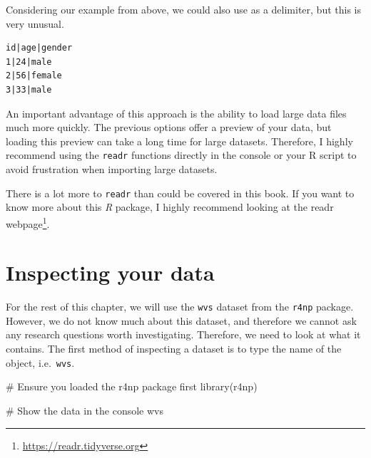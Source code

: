 \documentclass[
  letterpaper,
]{krantz}
\makeatletter
\newenvironment{Shaded}{\begin{snugshade}}{\end{snugshade}}
\newcommand{\CommentTok}[1]{\textcolor[rgb]{0.37,0.37,0.37}{#1}}
\newcommand{\FunctionTok}[1]{\textcolor[rgb]{0.28,0.35,0.67}{#1}}
\newcommand{\NormalTok}[1]{\textcolor[rgb]{0.00,0.23,0.31}{#1}}
\renewcommand{\href}[2]{#2\footnote{\url{#1}}}
\newenvironment{kframe}{%
\medskip{}
\setlength{\fboxsep}{.8em}
 \def\at@end@of@kframe{}%
 \ifinner\ifhmode%
  \def\at@end@of@kframe{\end{minipage}}%
  \begin{minipage}{\columnwidth}%
 \fi\fi%
 \def\FrameCommand##1{\hskip\@totalleftmargin \hskip-\fboxsep
 \colorbox{shadecolor}{##1}\hskip-\fboxsep
     \hskip-\linewidth \hskip-\@totalleftmargin \hskip\columnwidth}%
 \MakeFramed {\advance\hsize-\width
   \@totalleftmargin\z@ \linewidth\hsize
   \@setminipage}}%
 {\par\unskip\endMakeFramed%
 \at@end@of@kframe}
\renewenvironment{Shaded}{\begin{kframe}}{\end{kframe}}
\makeatother
\begin{document}
Considering our example from above, we could also use
\texttt{\textbar{}} as a delimiter, but this is very unusual.

\begin{verbatim}
id|age|gender
1|24|male
2|56|female
3|33|male
\end{verbatim}

An important advantage of this approach is the ability to load large
data files much more quickly. The previous options offer a preview of
your data, but loading this preview can take a long time for large
datasets. Therefore, I highly recommend using the \texttt{readr}
functions directly in the console or your R script to avoid frustration
when importing large datasets.

There is a lot more to \texttt{readr} than could be covered in this
book. If you want to know more about this \emph{R} package, I highly
recommend looking at the \href{https://readr.tidyverse.org}{readr
webpage}.

\section{Inspecting your data}\label{sec-inspecting-raw-data}

For the rest of this chapter, we will use the \texttt{wvs} dataset from
the \texttt{r4np} package. However, we do not know much about this
dataset, and therefore we cannot ask any research questions worth
investigating. Therefore, we need to look at what it contains. The first
method of inspecting a dataset is to type the name of the object,
i.e.~\texttt{wvs}.

\begin{Shaded}
\begin{Highlighting}[]
\CommentTok{\# Ensure you loaded the \textquotesingle{}r4np\textquotesingle{} package first}
\FunctionTok{library}\NormalTok{(r4np)}

\CommentTok{\# Show the data in the console}
\NormalTok{wvs}
\end{Highlighting}
\end{Shaded}
\end{document}
